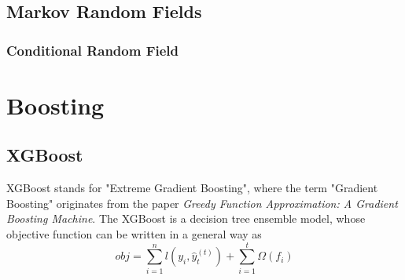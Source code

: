\documentclass[a3paper, 12pt]{book} %
\begin{document}
\section{Markov Random Fields}
\subsection{Conditional Random Field}

\chapter{Boosting}
\section{XGBoost}
XGBoost stands for "Extreme Gradient Boosting", where the term "Gradient Boosting" originates from the paper \emph{Greedy Function Approximation: A Gradient Boosting Machine}. The XGBoost is a decision tree ensemble model, whose objective function can be written in a general way as 
$$obj=\sum_{i=1}^{n}{l(y_i,\hat{y}_{t}^{(t)})+\sum_{i=1}^{t}{\Omega{(f_i)}}}$$
\end{document}
